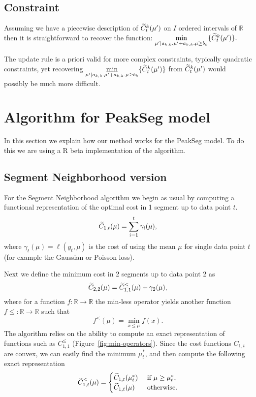 \documentclass{article}
\newcommand{\RR}{\mathbb R}
\begin{document}
\subsection{Constraint}
Assuming we have a piecewise description of $\widetilde{C}^{k}_{t}(\mu')$ on $I$ ordered intervals of $\mathbb{R}$
then it is straightforward to recover the function:
$\underset{\mu' | a_{k,k}. \mu' + a_{k,k}. \mu  \geq  b_{k}}{\min} \{ \widetilde{C}^{k}_{t}(\mu') \}.$

The update rule is a priori valid for more complex constraints, typically quadratic constraints, yet recovering
$\underset{\mu' | a_{k,k}. \mu' + a_{k,k}. \mu  \geq  b_{k}}{\min} \{ \widetilde{C}^{k}_{t}(\mu') \}$ from $\widetilde{C}^{k}_{t}(\mu')$ would possibly be much more difficult.


\section{Algorithm for PeakSeg model}

In this section we explain how our method works for the PeakSeg model.
To do this we are using a R beta implementation of the algorithm.

\subsection{Segment Neighborhood version}

For the Segment Neighborhood algorithm we begin as usual by computing
a functional representation of the optimal cost in 1 segment up to
data point $t$. 
\begin{equation*}
  \label{eq:C1b}
  \widetilde{C}_{1,t}(\mu) = \sum_{i=1}^t \gamma_i(\mu),
\end{equation*}
where $\gamma_t(\mu)=\ell(y_t, \mu)$ is the cost of using the mean
$\mu$ for single data point $t$ (for example the Gaussian or Poisson
loss).

Next we define the minimum cost in 2 segments up to data point 2 as
\begin{equation*}
  \label{eq:C22}
  \widetilde{C}_{2,2}(\mu) = \widetilde{C}_{1,1}^{\leq}(\mu) + \gamma_2(\mu),
\end{equation*}
where for a function $f:\RR\rightarrow\RR$ the min-less operator
yields another function $f\leq:\RR\rightarrow\RR$ such that
\begin{equation}
  \label{eq:min-less}
  f^{\leq}(\mu) = \min_{x\leq \mu} f(x).
\end{equation}
The algorithm relies on the ability to compute an exact representation
of functions such as $C_{1,1}^{\leq}$
(Figure~\ref{fig:min-operators}). Since the cost functions $C_{1,t}$
are convex, we can easily find the minimum $\mu_t^*$, and then compute
the following exact representation
\begin{equation*}
  \widetilde{C}_{1,t}^\leq(\mu)=
  \begin{cases}
    \widetilde{C}_{1,t}(\mu_t^*) & \text{ if } \mu \geq \mu_t^*,\\
    \widetilde{C}_{1,t}(\mu) & \text{ otherwise.}
  \end{cases}
\end{equation*}
\end{document}
